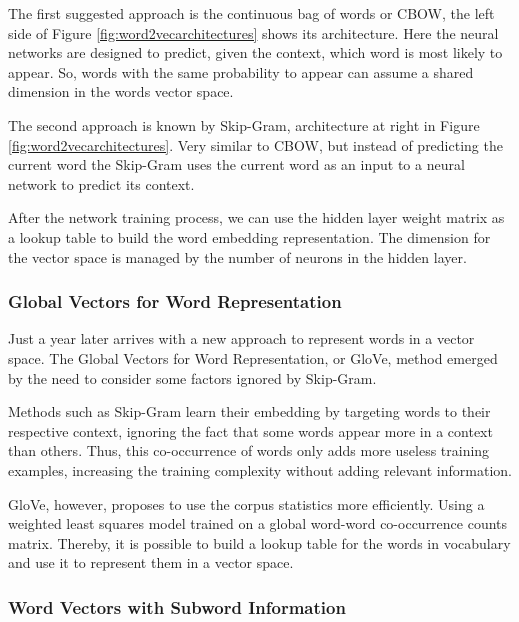	The first suggested approach is the continuous bag of words or CBOW, the left side of Figure \ref{fig:word2vecarchitectures} shows its architecture. Here the neural networks are designed to predict, given the context, which word is most likely to appear. So, words with the same probability to appear can assume a shared dimension in the words vector space. 

	The second approach is known by Skip-Gram, architecture at right in Figure \ref{fig:word2vecarchitectures}. Very similar to CBOW, but instead of predicting the current word the Skip-Gram uses the current word as an input to a neural network to predict its context.
	
	After the network training process, we can use the hidden layer weight matrix as a lookup table to build the word embedding representation. The dimension for the vector space is managed by the number of neurons in the hidden layer. 		
	
	
	\subsubsection{Global Vectors for Word Representation} %
	
	Just a year later  arrives with a new approach to represent words in a vector space. The Global Vectors for Word Representation, or GloVe, method emerged by the need to consider some factors ignored by Skip-Gram.
		
	Methods such as Skip-Gram learn their embedding by targeting words to their respective context, ignoring the fact that some words appear more in a context than others. Thus, this co-occurrence of words only adds more useless training examples, increasing the training complexity without adding relevant information.
	
	GloVe, however, proposes to use the corpus statistics more efficiently. Using a weighted least squares model trained on a global word-word co-occurrence counts matrix. Thereby, it is possible to build a lookup table for the words in vocabulary and use it to represent them in a vector space.
	
	
	\subsubsection{Word Vectors with Subword Information}
		
